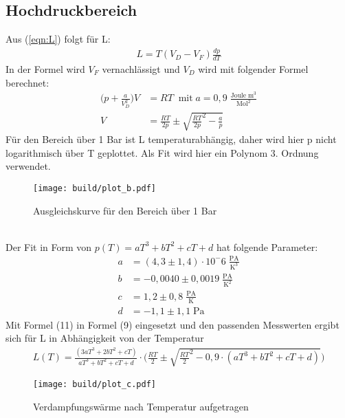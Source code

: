\subsection{Hochdruckbereich}
Aus (\ref{eqn:L}) folgt für L:
\begin{align*}
    L = T(V_D - V_F) \frac{dp}{dT}
\end{align*}
In der Formel wird $V_F$ vernachlässigt und $V_D$ wird mit folgender Formel berechnet:
\begin{align*}
    \biggl( p+\frac{a}{V_D^2} \biggr) V &= RT\;\; \text{mit} \; a = 0,9 \; \frac{\text{Joule}\;{\text{m}}^3}{{\text{Mol}^2}}\\
    V &= \frac{RT}{2p} \pm \sqrt{{\frac{RT}{2p}}^2-\frac{a}{p}}
\end{align*}
Für den Bereich über 1 Bar ist L temperaturabhängig, daher wird hier p nicht logarithmisch über T geplottet.
Als Fit wird hier ein Polynom 3. Ordnung verwendet.
\begin{figure}
    \centering
    \texttt{[image: build/plot\_b.pdf]}
    \caption{Ausgleichskurve für den Bereich über 1 Bar}
    \label{fig:Hochdruck}
\end{figure}
\\Der Fit in Form von $p(T) = aT^3+bT^2+cT+d$ hat folgende Parameter:
\begin{align*}
    a &= (4,3\pm 1,4)\cdot 10^-6 \; \frac{\text{PA}}{\text{K}^3}\\
    b &= -0,0040\pm 0,0019 \; \frac{\text{PA}}{\text{K}^2}\\
    c &= 1,2\pm 0,8 \; \frac{\text{PA}}{\text{K}}\\
    d &= -1,1\pm 1,1  \; \text{Pa}
\end{align*}
Mit Formel (11) in Formel (9) eingesetzt und den passenden Messwerten ergibt sich für L in Abhängigkeit von der Temperatur
\begin{align*}
    L(T) = \frac{(3aT^3+2bT^2+cT)}{aT^3+bT^2+cT+d}\cdot \biggl( \frac{RT}{2} \pm \sqrt{\frac{RT}{2}^2 - 0,9 \cdot (aT^3+bT^2+cT+d)} \biggr)
\end{align*}
\begin{figure}
    \centering
    \texttt{[image: build/plot\_c.pdf]}
    \caption{Verdampfungswärme nach Temperatur aufgetragen}
    \label{fig:Hochdruck}
\end{figure}